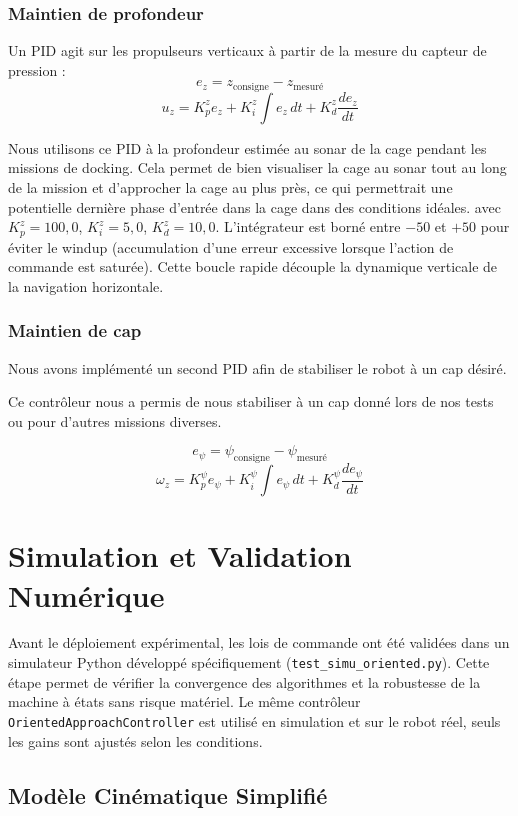 \subsubsection*{Maintien de profondeur}

Un PID agit sur les propulseurs verticaux à partir de la mesure du capteur de pression :
\[
e_z = z_{\text{consigne}} - z_{\text{mesuré}}
\]
\[
u_z = K_p^z e_z + K_i^z \int e_z \, dt + K_d^z \frac{de_z}{dt}
\]

Nous utilisons ce PID à la profondeur estimée au sonar de la cage pendant les missions de docking. Cela permet de bien visualiser la cage au sonar tout au long de la mission et d'approcher la cage au plus près, ce qui permettrait une potentielle dernière phase d'entrée dans la cage dans des conditions idéales.
avec $K_p^z = 100{,}0$, $K_i^z = 5{,}0$, $K_d^z = 10{,}0$. L'intégrateur est borné entre $-50$ et $+50$ pour éviter le windup (accumulation d'une erreur excessive lorsque l'action de commande est saturée). Cette boucle rapide découple la dynamique verticale de la navigation horizontale.

\subsubsection*{Maintien de cap}

Nous avons implémenté un second PID afin de stabiliser le robot à un cap désiré.

Ce contrôleur nous a permis de nous stabiliser à un cap donné lors de nos tests ou pour d'autres missions diverses.

\[
e_{\psi} = \psi_{\text{consigne}} - \psi_{\text{mesuré}} 
\]
\[
\omega_z = K_p^{\psi} e_{\psi} + K_i^{\psi} \int e_{\psi} \, dt + K_d^{\psi} \frac{de_{\psi}}{dt}
\]

\section{Simulation et Validation Numérique}

Avant le déploiement expérimental, les lois de commande ont été validées dans un simulateur Python développé spécifiquement (\texttt{test\_simu\_oriented.py}). Cette étape permet de vérifier la convergence des algorithmes et la robustesse de la machine à états sans risque matériel. Le même contrôleur \texttt{OrientedApproachController} est utilisé en simulation et sur le robot réel, seuls les gains sont ajustés selon les conditions.

\subsection{Modèle Cinématique Simplifié}

